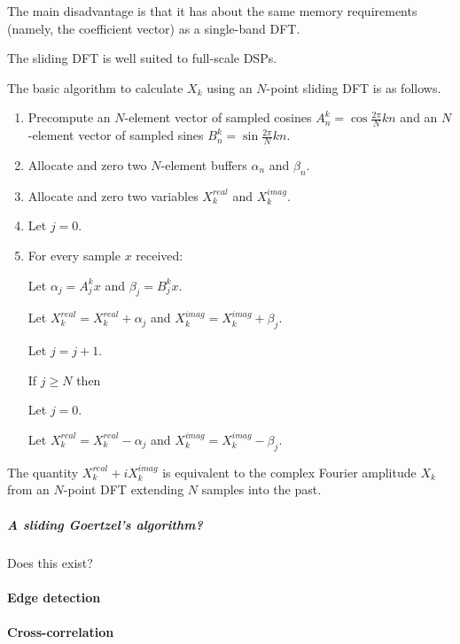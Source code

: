\documentclass[10pt]{article}
\begin{document}
The main disadvantage is that it has about the same memory requirements (namely, the coefficient vector) as a single-band DFT.

The sliding DFT is well suited to full-scale DSPs.

The basic algorithm to calculate \(X_k\) using an \(N\)-point sliding DFT is as follows.

\begin{enumerate}

\item Precompute an \(N\)-element vector of sampled cosines \(A_n^k=\cos {\frac{2 \pi}{N} k n}\) and an \(N\)-element vector of sampled sines \(B_n^k=\sin {\frac{2 \pi}{N} k n}\).

\item Allocate and zero two \(N\)-element buffers \(\alpha_n\) and \(\beta_n\).

\item Allocate and zero two variables \(X_k^{real}\) and \(X_k^{imag}\).

\item Let \(j=0\).

\item For every sample \(x\) received:

\subitem Let \(\alpha_j = A_j^k x\) and \(\beta_j = B_j^k x\).

\subitem Let \(X_k^{real} = X_k^{real} + \alpha_j\) and \(X_k^{imag} = X_k^{imag} + \beta_j\).

\subitem Let \(j = j + 1\).

\subitem If \(j \ge N\) then

\subsubitem Let \(j = 0\).

\subitem Let \(X_k^{real} = X_k^{real} - \alpha_j\) and \(X_k^{imag} = X_k^{imag} - \beta_j\).

\end{enumerate}

The quantity \(X_k^{real} + i X_k^{imag}\) is equivalent to the complex Fourier amplitude \(X_k\) from an \(N\)-point DFT extending \(N\) samples into the past.

\subparagraph{A sliding Goertzel's algorithm?}

Does this exist?

\paragraph{Edge detection}

\paragraph{Cross-correlation}
\end{document}
